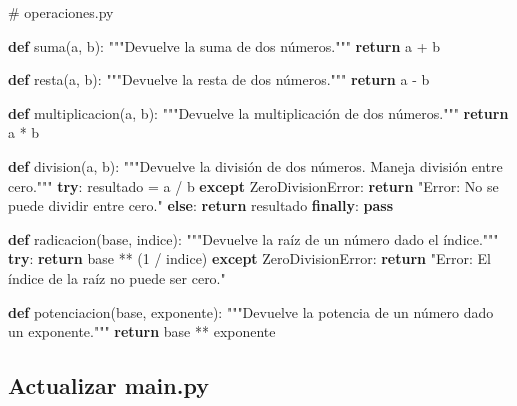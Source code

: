 \documentclass[
  a4paper,
  DIV=11,
  numbers=noendperiod,
  onepage,
  openany]{scrreprt}
\newenvironment{Shaded}{\begin{snugshade}}{\end{snugshade}}
\newcommand{\CommentTok}[1]{\textcolor[rgb]{0.37,0.37,0.37}{#1}}
\newcommand{\ControlFlowTok}[1]{\textcolor[rgb]{0.00,0.23,0.31}{\textbf{#1}}}
\newcommand{\DecValTok}[1]{\textcolor[rgb]{0.68,0.00,0.00}{#1}}
\newcommand{\KeywordTok}[1]{\textcolor[rgb]{0.00,0.23,0.31}{\textbf{#1}}}
\newcommand{\NormalTok}[1]{\textcolor[rgb]{0.00,0.23,0.31}{#1}}
\newcommand{\OperatorTok}[1]{\textcolor[rgb]{0.37,0.37,0.37}{#1}}
\newcommand{\PreprocessorTok}[1]{\textcolor[rgb]{0.68,0.00,0.00}{#1}}
\newcommand{\StringTok}[1]{\textcolor[rgb]{0.13,0.47,0.30}{#1}}
\begin{document}
\begin{Shaded}
\begin{Highlighting}[]
\CommentTok{\# operaciones.py}

\KeywordTok{def}\NormalTok{ suma(a, b):}
    \CommentTok{"""Devuelve la suma de dos números."""}
    \ControlFlowTok{return}\NormalTok{ a }\OperatorTok{+}\NormalTok{ b}


\KeywordTok{def}\NormalTok{ resta(a, b):}
    \CommentTok{"""Devuelve la resta de dos números."""}
    \ControlFlowTok{return}\NormalTok{ a }\OperatorTok{{-}}\NormalTok{ b}


\KeywordTok{def}\NormalTok{ multiplicacion(a, b):}
    \CommentTok{"""Devuelve la multiplicación de dos números."""}
    \ControlFlowTok{return}\NormalTok{ a }\OperatorTok{*}\NormalTok{ b}


\KeywordTok{def}\NormalTok{ division(a, b):}
    \CommentTok{"""Devuelve la división de dos números. Maneja división entre cero."""}
    \ControlFlowTok{try}\NormalTok{:}
\NormalTok{        resultado }\OperatorTok{=}\NormalTok{ a }\OperatorTok{/}\NormalTok{ b}
    \ControlFlowTok{except} \PreprocessorTok{ZeroDivisionError}\NormalTok{:}
        \ControlFlowTok{return} \StringTok{"Error: No se puede dividir entre cero."}
    \ControlFlowTok{else}\NormalTok{:}
        \ControlFlowTok{return}\NormalTok{ resultado}
    \ControlFlowTok{finally}\NormalTok{:}
        \ControlFlowTok{pass}


\KeywordTok{def}\NormalTok{ radicacion(base, indice):}
    \CommentTok{"""Devuelve la raíz de un número dado el índice."""}
    \ControlFlowTok{try}\NormalTok{:}
        \ControlFlowTok{return}\NormalTok{ base }\OperatorTok{**}\NormalTok{ (}\DecValTok{1} \OperatorTok{/}\NormalTok{ indice)}
    \ControlFlowTok{except} \PreprocessorTok{ZeroDivisionError}\NormalTok{:}
        \ControlFlowTok{return} \StringTok{"Error: El índice de la raíz no puede ser cero."}


\KeywordTok{def}\NormalTok{ potenciacion(base, exponente):}
    \CommentTok{"""Devuelve la potencia de un número dado un exponente."""}
    \ControlFlowTok{return}\NormalTok{ base }\OperatorTok{**}\NormalTok{ exponente}
\end{Highlighting}
\end{Shaded}

\subsection{Actualizar main.py}\label{actualizar-main.py-1}
\end{document}

